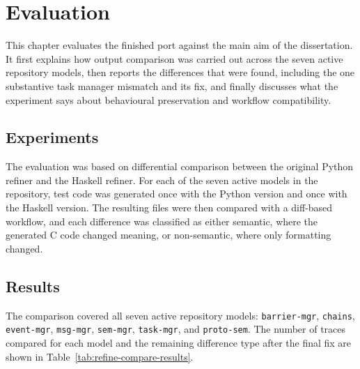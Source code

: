 \chapter{Evaluation}
\label{chap:Evaluation}


This chapter evaluates the finished port against the main aim of the dissertation. It first explains how output comparison was carried out across the seven active repository models, then reports the differences that were found, including the one substantive task manager mismatch and its fix, and finally discusses what the experiment says about behavioural preservation and workflow compatibility.

\section{Experiments}


The evaluation was based on differential comparison between the original Python refiner and the Haskell refiner. For each of the seven active models in the repository, test code was generated once with the Python version and once with the Haskell version. The resulting files were then compared with a diff-based workflow, and each difference was classified as either semantic, where the generated C code changed meaning, or non-semantic, where only formatting changed.



\section{Results}

The comparison covered all seven active repository models: \texttt{barrier-mgr}, \texttt{chains}, \texttt{event-mgr}, \texttt{msg-mgr}, \texttt{sem-mgr}, \texttt{task-mgr}, and \texttt{proto-sem}. The number of traces compared for each model and the remaining difference type after the final fix are shown in Table~\ref{tab:refine-compare-results}.

